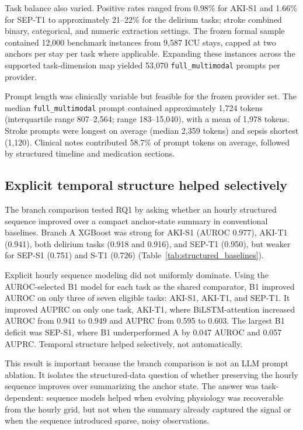 \documentclass[pdflatex,sn-nature]{sn-jnl}
\begin{document}
Task balance also varied. Positive rates ranged from 0.98\% for AKI-S1 and 1.66\% for SEP-T1 to approximately 21--22\% for the delirium tasks; stroke combined binary, categorical, and numeric extraction settings. The frozen formal sample contained 12,000 benchmark instances from 9,587 ICU stays, capped at two anchors per stay per task where applicable. Expanding these instances across the supported task-dimension map yielded 53,070 \texttt{full\_multimodal} prompts per provider.

Prompt length was clinically variable but feasible for the frozen provider set. The median \texttt{full\_multimodal} prompt contained approximately 1,724 tokens (interquartile range 807--2,564; range 183--15,040), with a mean of 1,978 tokens. Stroke prompts were longest on average (median 2,359 tokens) and sepsis shortest (1,120). Clinical notes contributed 58.7\% of prompt tokens on average, followed by structured timeline and medication sections.



\addtocounter{table}{-1}
\begingroup
\renewcommand{\theHtable}{table.panelb}

\endgroup

\FloatBarrier

\subsection{Explicit temporal structure helped selectively}

The branch comparison tested RQ1 by asking whether an hourly structured sequence improved over a compact anchor-state summary in conventional baselines. Branch A XGBoost was strong for AKI-S1 (AUROC 0.977), AKI-T1 (0.941), both delirium tasks (0.918 and 0.916), and SEP-T1 (0.950), but weaker for SEP-S1 (0.751) and S-T1 (0.726) (Table~\ref{tab:structured_baselines}).

Explicit hourly sequence modeling did not uniformly dominate. Using the AUROC-selected B1 model for each task as the shared comparator, B1 improved AUROC on only three of seven eligible tasks: AKI-S1, AKI-T1, and SEP-T1. It improved AUPRC on only one task, AKI-T1, where BiLSTM-attention increased AUROC from 0.941 to 0.949 and AUPRC from 0.595 to 0.603. The largest B1 deficit was SEP-S1, where B1 underperformed A by 0.047 AUROC and 0.057 AUPRC. Temporal structure helped selectively, not automatically.

This result is important because the branch comparison is not an LLM prompt ablation. It isolates the structured-data question of whether preserving the hourly sequence improves over summarizing the anchor state. The answer was task-dependent: sequence models helped when evolving physiology was recoverable from the hourly grid, but not when the summary already captured the signal or when the sequence introduced sparse, noisy observations.
\end{document}
